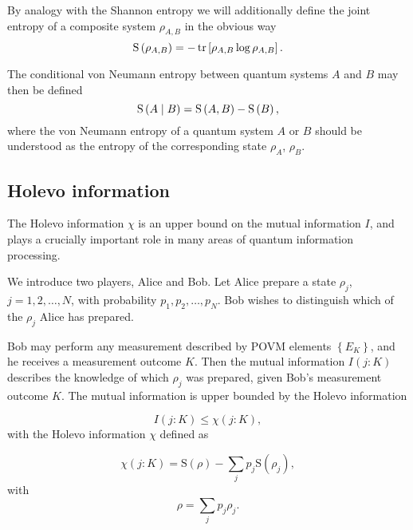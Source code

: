 By analogy with the Shannon entropy we will additionally define the joint entropy of a composite system $\rho_{A, B}$ in the obvious way
\begin{equation}
\text{S}\left(\rho_{A, B}\right) = - \tr\left[\rho_{A, B} \log \rho_{A, B}\right].
\end{equation}

\noindent The conditional von Neumann entropy between quantum systems $A$ and $B$ may then be defined
\begin{equation}
\text{S}\left(A \; \middle| \; B\right) = \text{S}\left(A, B\right) - \text{S}\left(B\right),
\end{equation}
where the von Neumann entropy of a quantum system $A$ or $B$ should be understood as the entropy of the corresponding state $\rho_A$, $\rho_B$.


\FloatBarrier
\subsection{Holevo information}\label{sec:intro_holevo}
The Holevo information $\chi$ is an upper bound on the mutual information $I$, and plays a crucially important role in many areas of quantum information processing. 

We introduce two players, Alice and Bob. Let Alice prepare a state $\rho_j$, $j = 1, 2, \dots, N$, with probability $p_1, p_2, \dots, p_N$. Bob wishes to distinguish which of the $\rho_j$ Alice has prepared. 

Bob may perform any measurement described by POVM elements $\left\{E_K\right\}$, and he receives a measurement outcome $K$. Then the mutual information $I\left(j : K\right)$ describes the knowledge of which $\rho_j$ was prepared, given Bob's measurement outcome $K$. The mutual information is upper bounded by the Holevo information

\begin{equation}\label{eqn:intro_holevo_bound}
I\left(j : K \right) \le \chi \left(j : K \right),
\end{equation}
with the Holevo information $\chi$ defined as

\begin{equation}\label{eqn:intro_holevo}
\chi\left(j : K\right)  = \text{S}\left(\rho\right) - \sum_j p_j \text{S}\left(\rho_j\right),
\end{equation}
with
\begin{equation}
\rho = \sum_j p_j \rho_j.
\end{equation}

